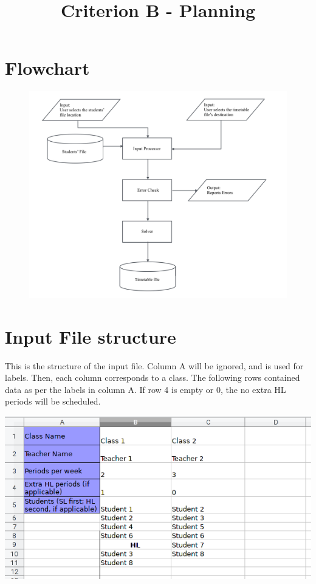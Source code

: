 \documentclass[12pt]{article}
\title{Criterion B - Planning}
\author{}
\date{}
\begin{document}
\maketitle

\section*{Flowchart}
%
\begin{figure}[H]
    \centering
    \includegraphics[height=0.4\textheight]{system_flowchart}
\end{figure}
%
\section*{Input File structure}
This is the structure of the input file. Column A will be ignored, and is used for labels.
Then, each column corresponds to a class. The following rows contained data as per the
labels in column A. If row 4 is empty or 0, the no extra HL periods will be scheduled. 

\includegraphics[width=\textwidth]{data_file_structure.png}
\end{document}
